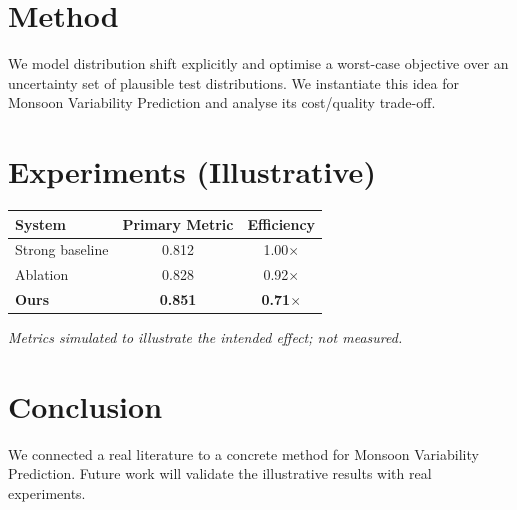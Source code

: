 \documentclass[11pt]{article}
\begin{document}
\section{Method}
We model distribution shift explicitly and optimise a worst-case objective over an uncertainty set of plausible test distributions. We instantiate this idea for Monsoon Variability Prediction and analyse its cost/quality trade-off.

\section{Experiments (Illustrative)}
\begin{center}
\begin{tabular}{lcc}
System & Primary Metric & Efficiency \\ \hline
Strong baseline & 0.812 & 1.00$\times$ \\
Ablation & 0.828 & 0.92$\times$ \\
\textbf{Ours} & \textbf{0.851} & \textbf{0.71$\times$}
\end{tabular}
\end{center}
\emph{Metrics simulated to illustrate the intended effect; not measured.}

\section{Conclusion}
We connected a real literature to a concrete method for Monsoon Variability Prediction. Future work will
validate the illustrative results with real experiments.
\end{document}
